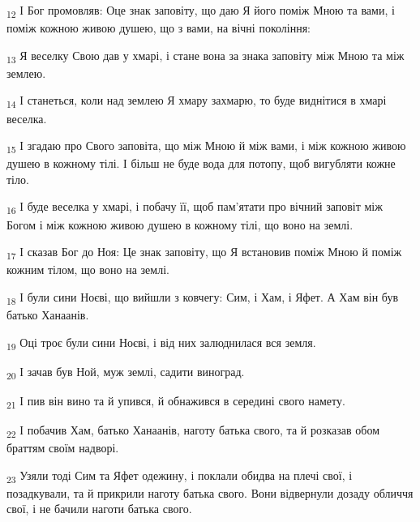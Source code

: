 \begin{tcolorbox}
\textsubscript{12} І Бог промовляв: Оце знак заповіту, що даю Я його поміж Мною та вами, і поміж кожною живою душею, що з вами, на вічні покоління:
\end{tcolorbox}
\begin{tcolorbox}
\textsubscript{13} Я веселку Свою дав у хмарі, і стане вона за знака заповіту між Мною та між землею.
\end{tcolorbox}
\begin{tcolorbox}
\textsubscript{14} І станеться, коли над землею Я хмару захмарю, то буде виднітися в хмарі веселка.
\end{tcolorbox}
\begin{tcolorbox}
\textsubscript{15} І згадаю про Свого заповіта, що між Мною й між вами, і між кожною живою душею в кожному тілі. І більш не буде вода для потопу, щоб вигубляти кожне тіло.
\end{tcolorbox}
\begin{tcolorbox}
\textsubscript{16} І буде веселка у хмарі, і побачу її, щоб пам'ятати про вічний заповіт між Богом і між кожною живою душею в кожному тілі, що воно на землі.
\end{tcolorbox}
\begin{tcolorbox}
\textsubscript{17} І сказав Бог до Ноя: Це знак заповіту, що Я встановив поміж Мною й поміж кожним тілом, що воно на землі.
\end{tcolorbox}
\begin{tcolorbox}
\textsubscript{18} І були сини Ноєві, що вийшли з ковчегу: Сим, і Хам, і Яфет. А Хам він був батько Ханаанів.
\end{tcolorbox}
\begin{tcolorbox}
\textsubscript{19} Оці троє були сини Ноєві, і від них залюднилася вся земля.
\end{tcolorbox}
\begin{tcolorbox}
\textsubscript{20} І зачав був Ной, муж землі, садити виноград.
\end{tcolorbox}
\begin{tcolorbox}
\textsubscript{21} І пив він вино та й упився, й обнажився в середині свого намету.
\end{tcolorbox}
\begin{tcolorbox}
\textsubscript{22} І побачив Хам, батько Ханаанів, наготу батька свого, та й розказав обом браттям своїм надворі.
\end{tcolorbox}
\begin{tcolorbox}
\textsubscript{23} Узяли тоді Сим та Яфет одежину, і поклали обидва на плечі свої, і позадкували, та й прикрили наготу батька свого. Вони відвернули дозаду обличчя свої, і не бачили наготи батька свого.
\end{tcolorbox}
